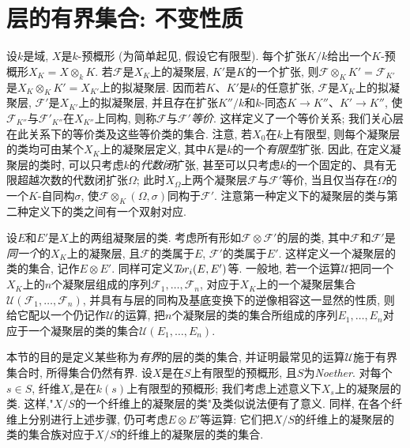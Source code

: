 \chapter{层的有界集合: 不变性质}\thispagestyle{fancy}\label{fga3.iv-1}
\par{}设\(k\)是域, \(X\)是\(k\)-预概形 (为简单起见, 假设它有限型). 每个扩张\(K/k\)给出一个\(K\)-预概形\(X_K=X\otimes _k K\). 若\(\mathscr {F}\)是\(X_K\)上的凝聚层, \(K'\)是\(K\)的一个扩张, 则\(\mathscr {F}\otimes _K K'=\mathscr {F}_{K'}\)是\(X_K\otimes _KK'=X_{K'}\)上的拟凝聚层. 因而若\(K\)、\(K'\)是\(k\)的任意扩张, \(\mathscr {F}\)是\(X_K\)上的拟凝聚层, \(\mathscr {F}'\)是\(X_{K'}\)上的拟凝聚层, 并且存在扩张\(K''/k\)和\(k\)-同态\(K\to  K''\)、\(K'\to  K''\), 使\(\mathscr {F}_{K''}\)与\(\mathscr {F}'_{K''}\)在\(X_{K''}\)上同构, 则称\(\mathscr {F}\)与\(\mathscr {F}'\)\emph{等价}. 这样定义了一个等价关系; 我们关心层在此关系下的等价类及这些等价类的集合. 注意, 若\(X_0\)在\(k\)上有限型, 则每个凝聚层的类均可由某个\(X_K\)上的凝聚层定义, 其中\(K\)是\(k\)的一个\emph{有限型}扩张. 因此, 在定义凝聚层的类时, 可以只考虑\(k\)的\emph{代数闭}扩张, 甚至可以只考虑\(k\)的一个固定的、具有无限超越次数的代数闭扩张\(\Omega \); 此时\(X_\Omega \)上两个凝聚层\(\mathscr {F}\)与\(\mathscr {F}'\)等价, 当且仅当存在\(\Omega \)的一个\(K\)-自同构\(\sigma \), 使\(\mathscr {F}\otimes _K(\Omega ,\sigma )\)同构于\(\mathscr {F}'\). 注意第一种定义下的凝聚层的类与第二种定义下的类之间有一个双射对应.
\par{}设\(E\)和\(E'\)是\(X\)上的两组凝聚层的类. 考虑所有形如\(\mathscr {F}\otimes \mathscr {F}'\)的层的类, 其中\(\mathscr {F}\)和\(\mathscr {F}'\)是\emph{同一个}的\(X_K\)上的凝聚层, 且\(\mathscr {F}\)的类属于\(E\), \(\mathscr {F}'\)的类属于\(E'\). 这样定义一个凝聚层的类的集合, 记作\(E\otimes  E'\). 同样可定义\(\mathscr {T}\kern  -2.75pt\mathit {or}_i(E,E')\)等. 一般地, 若一个运算\(\mathscr {U}\)把同一个\(X_K\)上的\(n\)个凝聚层组成的序列\(\mathscr {F}_1,\ldots ,\mathscr {F}_n\), 对应于\(X_K\)上的一个凝聚层集合\(\mathscr {U}(\mathscr {F}_1,\ldots ,\mathscr {F}_n)\), 并具有与层的同构及基底变换下的逆像相容这一显然的性质, 则给它配以一个仍记作\(\mathscr {U}\)的运算, 把\(n\)个凝聚层的类的集合所组成的序列\(E_1,\ldots ,E_n\)对应于一个凝聚层的类的集合\(\mathscr {U}(E_1,\ldots ,E_n)\).
\par{}本节的目的是定义某些称为\emph{有界}的层的类的集合, 并证明最常见的运算\(\mathscr {U}\)施于有界集合时, 所得集合仍然有界. 设\(X\)是在\(S\)上有限型的预概形, 且\(S\)为\emph{Noether}. 对每个\(s\in  S\), 纤维\(X_s\)是在\(k(s)\)上有限型的预概形; 我们考虑上述意义下\(X_s\)上的凝聚层的类. 这样,"\(X/S\)的一个纤维上的凝聚层的类"及类似说法便有了意义. 同样, 在各个纤维上分别进行上述步骤, 仍可考虑\(E\otimes  E'\)等运算: 它们把\(X/S\)的纤维上的凝聚层的类的集合族对应于\(X/S\)的纤维上的凝聚层的类的集合.

